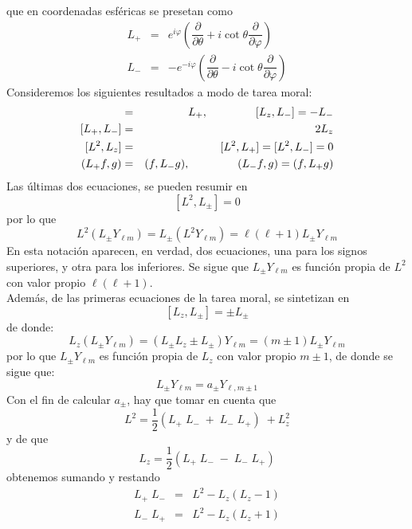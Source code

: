 que en coordenadas esféricas se presetan como
\begin{eqnarray}
L_{+} &=& e^{i \varphi} \left( \dfrac{\partial}{\partial \theta} + i \cot \theta \dfrac{\partial}{\partial \varphi} \right) \nonumber \\
L_{-} &=& - e^{- i \varphi} \left( \dfrac{\partial}{\partial \theta} - i \cot \theta \dfrac{\partial}{\partial \varphi} \right) \nonumber
\end{eqnarray}
Consideremos los siguientes resultados a modo de tarea moral:
\begin{eqnarray*}
[L_{z}, L_{+}] &=& L_{+}, \hspace{1.5cm} [L_{z}, L_{-}] = - L_{-} \nonumber \\
[L_{+}, L_{-}] &=&  2 L_{z} \nonumber \\
[L^{2}, L_{z}] &=& [L^{2}, L_{+}] = [L^{2}, L_{-}] = 0 \nonumber \\
(L_{+} f, g) &=& (f, L_{-} g), \hspace{1.5cm} (L_{-} f, g) = (f, L_{+} g) \nonumber
\end{eqnarray*}
Las últimas dos ecuaciones, se pueden resumir en
\[ [L^{2}, L_{\pm}] = 0 \]
por lo que
\[ L^{2} (L_{\pm} Y_{\ell m}) =  L_{\pm} (L^{2} Y_{\ell m} ) = \ell (\ell + 1) L_{\pm} Y_{\ell m} \]
En esta notación aparecen, en verdad, dos ecuaciones, una para los signos superiores, y otra para los inferiores. Se sigue que $L_{\pm} Y_{\ell m}$ es función propia de $L^{2}$ con valor propio $\ell (\ell + 1)$.
\\
Además, de las primeras ecuaciones de la tarea moral, se sintetizan en
\[ [L_{z}, L_{\pm}] = \pm L_{\pm} \]
de donde:
\[ L_{z} (L_{\pm} Y_{\ell m}) = (L_{\pm} L_{z} \pm L_{\pm}) Y_{\ell m} = (m \pm 1) L_{\pm} Y_{\ell m} \]
por lo que $L_{\pm} Y_{\ell m}$ es función propia de $L_{z}$ con valor propio $m \pm 1$, de donde se sigue que:
\begin{equation}
L_{\pm} Y_{\ell m} = a_{\pm} Y_{\ell, m \pm 1}
\label{eq:ecuacion_8_45}
\end{equation}
Con el fin de calcular $a_{\pm}$, hay que tomar en cuenta que 
\[ L^{2} = \dfrac{1}{2} (L_{+} \; L_{-} \; + \; L_{-} \; L_{+}) \; +  L_{z}^{2} \]
y de que
\[ L_{z} = \dfrac{1}{2} (L_{+} \; L_{-} \; - \; L_{-} \; L_{+}) \]
obtenemos sumando y restando
\begin{eqnarray*}
L_{+} \; L_{-} &=& L^{2} - L_{z} (L_{z} - 1) \nonumber \\
L_{-} \; L_{+} &=& L^{2} - L_{z} (L_{z} + 1) \nonumber
\end{eqnarray*}

